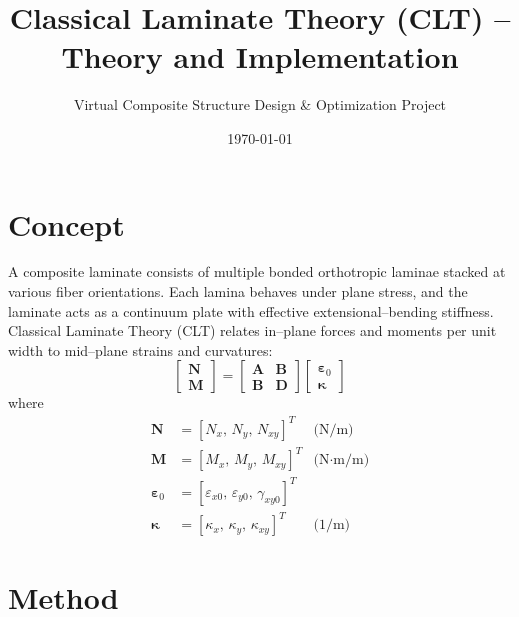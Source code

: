 \documentclass[12pt,a4paper]{article}
\begin{document}
\title{Classical Laminate Theory (CLT) -- Theory and Implementation}
\author{Virtual Composite Structure Design \& Optimization Project}
\date{\today}
\maketitle
\tableofcontents
\newpage

\section{Concept}
A composite laminate consists of multiple bonded orthotropic laminae stacked at various fiber orientations.
Each lamina behaves under plane stress, and the laminate acts as a continuum plate with effective
extensional--bending stiffness. Classical Laminate Theory (CLT) relates in--plane forces and moments per unit width
to mid--plane strains and curvatures:
\begin{equation}
\begin{bmatrix}
\mathbf{N} \\[3pt] \mathbf{M}
\end{bmatrix}
=
\begin{bmatrix}
\mathbf{A} & \mathbf{B} \\[3pt]
\mathbf{B} & \mathbf{D}
\end{bmatrix}
\begin{bmatrix}
\boldsymbol{\varepsilon}_0 \\[3pt] \boldsymbol{\kappa}
\end{bmatrix}
\end{equation}
%
where
\begin{align*}
\mathbf{N} &= [N_x,\, N_y,\, N_{xy}]^T &\text{(N/m)}\\
\mathbf{M} &= [M_x,\, M_y,\, M_{xy}]^T &\text{(N·m/m)}\\
\boldsymbol{\varepsilon}_0 &= [\varepsilon_{x0},\,\varepsilon_{y0},\,\gamma_{xy0}]^T \\
\boldsymbol{\kappa} &= [\kappa_x,\,\kappa_y,\,\kappa_{xy}]^T &\text{(1/m)}
\end{align*}

\section{Method}
\end{document}
